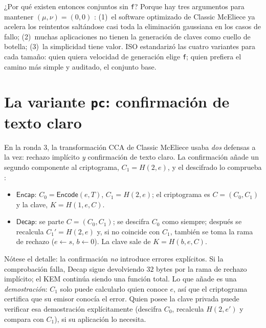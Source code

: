 \documentclass[11pt,a4paper,oneside]{report}
\begin{document}
¿Por qué existen entonces conjuntos sin \texttt{f}? Porque hay tres
argumentos para mantener $(\mu,\nu)=(0,0)$ \cite{cmrationale}: (1)~el
software optimizado de Classic McEliece ya acelera los reintentos
saltándose casi toda la eliminación gaussiana en los casos de fallo;
(2)~muchas aplicaciones no tienen la generación de claves como cuello
de botella; (3)~la simplicidad tiene valor. ISO estandarizó las
cuatro variantes para cada tamaño: quien quiera velocidad de
generación elige \texttt{f}; quien prefiera el camino más simple y
auditado, el conjunto base.

\section{La variante \texttt{pc}: confirmación de texto claro}\label{sec:param-pc}

En la ronda 3, la transformación CCA de Classic McEliece usaba
\emph{dos} defensas a la vez: rechazo implícito \emph{y} confirmación
de texto claro. La confirmación añade un segundo componente al
criptograma, $C_1=H(2,e)$, y el descifrado lo comprueba
\cite{cmpc}:

\begin{itemize}[leftmargin=1.5em,itemsep=3pt]
  \item $\textsf{Encap}$: $C_0=\textsf{Encode}(e,T)$,
        $C_1=H(2,e)$; el criptograma es $C=(C_0,C_1)$ y la clave,
        $K=H(1,e,C)$.
  \item $\textsf{Decap}$: se parte $C=(C_0,C_1)$; se descifra
        $C_0$ como siempre; después se recalcula $C_1'=H(2,e)$ y, si
        no coincide con $C_1$, también se toma la rama de rechazo
        ($e\leftarrow s$, $b\leftarrow0$). La clave sale de
        $K=H(b,e,C)$.
\end{itemize}

Nótese el detalle: la confirmación \emph{no} introduce errores
explícitos. Si la comprobación falla, \textsf{Decap} sigue devolviendo
$32$ bytes por la rama de rechazo implícito; el KEM continúa siendo
una función total. Lo que añade es una \emph{demostración}: $C_1$ solo
puede calcularlo quien conoce $e$, así que el criptograma certifica
que su emisor conocía el error. Quien posee la clave privada puede
verificar esa demostración explícitamente (descifra $C_0$, recalcula
$H(2,e')$ y compara con $C_1$), si su aplicación lo necesita.
\end{document}
